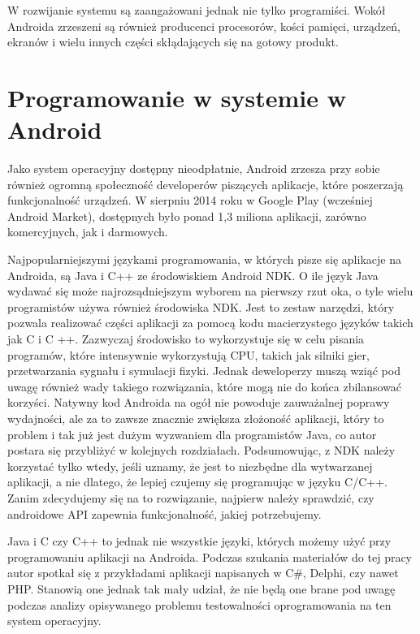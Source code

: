 W rozwijanie systemu są zaangażowani jednak nie tylko programiści. Wokół Androida zrzeszeni są również producenci procesorów, kości pamięci, urządzeń, ekranów i wielu innych części skłądających się na gotowy produkt.

\section{Programowanie w systemie w Android}
Jako system operacyjny dostępny nieodpłatnie, Android zrzesza przy sobie również ogromną społeczność developerów piszących aplikacje, które poszerzają funkcjonalność urządzeń. W sierpniu 2014 roku w Google Play (wcześniej Android Market), dostępnych było ponad 1,3 miliona aplikacji, zarówno komercyjnych, jak i darmowych.

Najpopularniejszymi językami programowania, w których pisze się aplikacje na Androida, są Java i C++ ze środowiskiem Android NDK. O ile język Java wydawać się może najrozsądniejszym wyborem na pierwszy rzut oka, o tyle wielu programistów używa również środowiska NDK. Jest to zestaw narzędzi, który pozwala realizować części aplikacji za pomocą kodu macierzystego języków takich jak C i C ++. Zazwyczaj środowisko to wykorzystuje się w celu pisania programów, które intensywnie wykorzystują CPU, takich jak silniki gier, przetwarzania sygnału i symulacji fizyki. Jednak deweloperzy muszą wziąć pod uwagę również wady takiego rozwiązania, które mogą nie do końca zbilansować korzyści. Natywny kod Androida na ogół nie powoduje zauważalnej poprawy wydajności, ale za to zawsze znacznie zwiększa złożoność aplikacji, który to problem i tak już jest dużym wyzwaniem dla programistów Java, co autor postara się przybliżyć w kolejnych rozdziałach. Podsumowując, z NDK należy korzystać tylko wtedy, jeśli uznamy, że jest to niezbędne dla wytwarzanej aplikacji, a nie dlatego, że lepiej czujemy się programując w języku C/C++. Zanim zdecydujemy się na to rozwiązanie, najpierw należy sprawdzić, czy androidowe API zapewnia funkcjonalność, jakiej potrzebujemy.

Java i C czy C++ to jednak nie wszystkie języki, których możemy użyć przy programowaniu aplikacji na Androida. Podczas szukania materiałów do tej pracy autor spotkał się z przykładami aplikacji napisanych w C\#, Delphi, czy nawet PHP. Stanowią one jednak tak mały udział, że nie będą one brane pod uwagę podczas analizy opisywanego problemu testowalności oprogramowania na ten system operacyjny.




